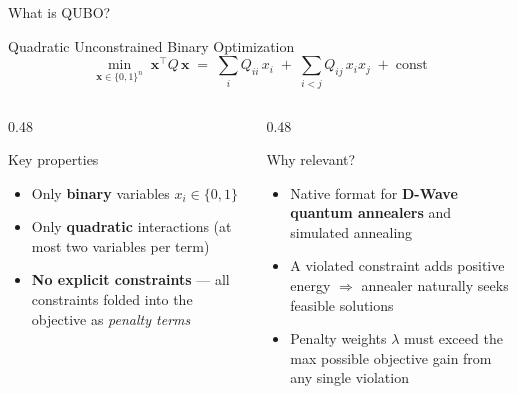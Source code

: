 \documentclass[aspectratio=169]{beamer}
\begin{document}
\begin{frame}{What is QUBO?}
\begin{block}{Quadratic Unconstrained Binary Optimization}
\[
\min_{\mathbf{x}\in\{0,1\}^n}\; \mathbf{x}^\top Q\,\mathbf{x}
\;=\; \sum_i Q_{ii}\,x_i \;+\; \sum_{i<j} Q_{ij}\,x_i x_j \;+\; \text{const}
\]
\end{block}
\vspace{0.2cm}
\begin{columns}[t]
\begin{column}{0.48\textwidth}
\begin{block}{Key properties}
\footnotesize
\begin{itemize}
    \item Only \textbf{binary} variables $x_i\in\{0,1\}$
    \item Only \textbf{quadratic} interactions (at most two variables per term)
    \item \textbf{No explicit constraints} — all constraints folded into the
          objective as \emph{penalty terms}
\end{itemize}
\end{block}
\end{column}
\begin{column}{0.48\textwidth}
\begin{block}{Why relevant?}
\footnotesize
\begin{itemize}
    \item Native format for \textbf{D-Wave quantum annealers} and
          simulated annealing
    \item A violated constraint adds positive energy $\Rightarrow$ annealer
          naturally seeks feasible solutions
    \item Penalty weights $\lambda$ must exceed the max possible objective
          gain from any single violation
\end{itemize}
\end{block}
\end{column}
\end{columns}
\end{frame}
\end{document}
